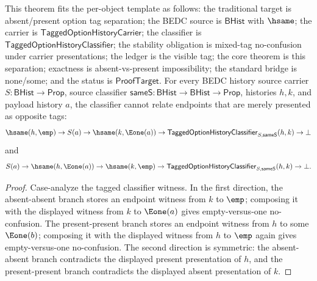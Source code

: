 \begin{theorem}
\label{thm:tagged-option-history-carrier-mixed-tag-separation}
This theorem fits the per-object template as follows: the traditional target is
absent/present option tag separation; the BEDC source is $\mathsf{BHist}$ with
$\hsame$; the carrier is $\mathsf{TaggedOptionHistoryCarrier}$; the classifier is
$\mathsf{TaggedOptionHistoryClassifier}$; the stability obligation is mixed-tag
no-confusion under carrier presentations; the ledger is the visible tag; the
core theorem is this separation; exactness is absent-vs-present impossibility;
the standard bridge is none/some; and the status is $\mathsf{ProofTarget}$.
For every BEDC history source carrier $S:\mathsf{BHist}\to\mathsf{Prop}$,
source classifier $\mathsf{sameS}:\mathsf{BHist}\to\mathsf{BHist}\to\mathsf{Prop}$,
histories $h,k$, and payload history $a$, the classifier cannot relate endpoints
that are merely presented as opposite tags:
$$
\hsame(h,\emp)\to S(a)\to \hsame(k,\Eone(a))\to
\mathsf{TaggedOptionHistoryClassifier}_{S,\mathsf{sameS}}(h,k)\to\bot
$$
and
$$
S(a)\to \hsame(h,\Eone(a))\to \hsame(k,\emp)\to
\mathsf{TaggedOptionHistoryClassifier}_{S,\mathsf{sameS}}(h,k)\to\bot.
$$
\end{theorem}
\begin{proof}
Case-analyze the tagged classifier witness. In the first direction, the
absent-absent branch stores an endpoint witness from $k$ to $\emp$; composing it
with the displayed witness from $k$ to $\Eone(a)$ gives empty-versus-one
no-confusion. The present-present branch stores an endpoint witness from $h$ to
some $\Eone(b)$; composing it with the displayed witness from $h$ to $\emp$ again
gives empty-versus-one no-confusion. The second direction is symmetric: the
absent-absent branch contradicts the displayed present presentation of $h$, and
the present-present branch contradicts the displayed absent presentation of $k$.
\end{proof}

